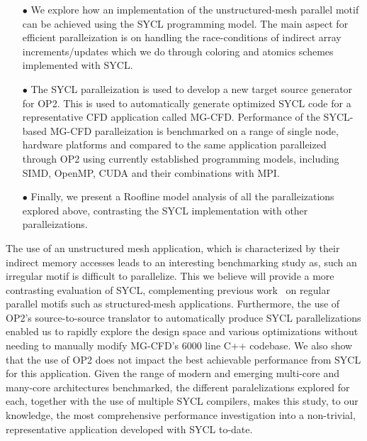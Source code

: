 \documentclass[runningheads]{llncs}
\begin{document}
\begin{itemize}
\item [$\bullet$] We explore how an implementation of the unstructured-mesh 
parallel motif can be achieved using the SYCL programming model. The main aspect 
for efficient paralleization is on handling the race-conditions of indirect 
array increments/updates which we do through coloring and atomics schemes 
implemented with SYCL. 


\item [$\bullet$] The SYCL paralleization is used to develop a new target source 
generator for OP2. This is used to automatically generate optimized SYCL code 
for a representative CFD application called MG-CFD. Performance of the 
SYCL-based MG-CFD paralleization is benchmarked on a range of single node, 
hardware platforms and compared to the same application paralleized through OP2 
using currently established programming models, including SIMD, OpenMP, CUDA and 
their combinations with MPI. 

\item [$\bullet$] Finally, we present a Roofline model analysis of all the 
paralleizations explored above, contrasting the SYCL implementation with other 
paralleizations.

\end{itemize}

\noindent The use of an unstructured mesh application, which is characterized 
by their indirect memory accesses leads to an interesting benchmarking study as, 
such an irregular motif is difficult to parallelize. This we believe will provide 
a more contrasting evaluation of SYCL, complementing previous 
work~\cite{Deakin2020} on regular parallel motifs such as structured-mesh 
applications. Furthermore, the use of OP2's source-to-source translator to 
automatically produce SYCL parallelizations enabled us to rapidly explore the 
design space and various optimizations without needing to manually modify 
MG-CFD's 6000 line C++ codebase. We also show that the use of OP2 does not 
impact the best achievable performance from SYCL for this application. Given 
the range of modern and emerging multi-core and many-core architectures 
benchmarked, the different paralelizations explored for each, together with the 
use of multiple SYCL compilers, makes this study, to our knowledge, the most 
comprehensive performance investigation into a non-trivial, representative 
application developed with SYCL to-date. 
\end{document}
